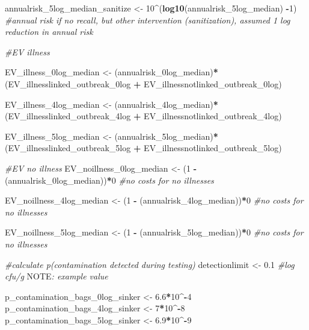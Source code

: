 \documentclass[
]{article}
\newenvironment{Shaded}{\begin{snugshade}}{\end{snugshade}}
\newcommand{\AlertTok}[1]{\textcolor[rgb]{0.94,0.16,0.16}{#1}}
\newcommand{\CommentTok}[1]{\textcolor[rgb]{0.56,0.35,0.01}{\textit{#1}}}
\newcommand{\DecValTok}[1]{\textcolor[rgb]{0.00,0.00,0.81}{#1}}
\newcommand{\FloatTok}[1]{\textcolor[rgb]{0.00,0.00,0.81}{#1}}
\newcommand{\FunctionTok}[1]{\textcolor[rgb]{0.13,0.29,0.53}{\textbf{#1}}}
\newcommand{\NormalTok}[1]{#1}
\newcommand{\OtherTok}[1]{\textcolor[rgb]{0.56,0.35,0.01}{#1}}
\newcommand{\SpecialCharTok}[1]{\textcolor[rgb]{0.81,0.36,0.00}{\textbf{#1}}}
\begin{document}
\begin{Shaded}
\begin{Highlighting}[]
\NormalTok{annualrisk\_5log\_median\_sanitize }\OtherTok{\textless{}{-}} \DecValTok{10}\SpecialCharTok{\^{}}\NormalTok{(}\FunctionTok{log10}\NormalTok{(annualrisk\_5log\_median) }\SpecialCharTok{{-}}\DecValTok{1}\NormalTok{) }\CommentTok{\#annual risk if no recall, but other intervention (sanitization), assumed 1 log reduction in annual risk}


\CommentTok{\#EV illness}

\NormalTok{EV\_illness\_0log\_median }\OtherTok{\textless{}{-}}\NormalTok{ (annualrisk\_0log\_median)}\SpecialCharTok{*}\NormalTok{(EV\_illnesslinked\_outbreak\_0log }\SpecialCharTok{+}\NormalTok{ EV\_illnessnotlinked\_outbreak\_0log)}

\NormalTok{EV\_illness\_4log\_median }\OtherTok{\textless{}{-}}\NormalTok{ (annualrisk\_4log\_median)}\SpecialCharTok{*}\NormalTok{(EV\_illnesslinked\_outbreak\_4log }\SpecialCharTok{+}\NormalTok{ EV\_illnessnotlinked\_outbreak\_4log)}

\NormalTok{EV\_illness\_5log\_median }\OtherTok{\textless{}{-}}\NormalTok{ (annualrisk\_5log\_median)}\SpecialCharTok{*}\NormalTok{(EV\_illnesslinked\_outbreak\_5log }\SpecialCharTok{+}\NormalTok{ EV\_illnessnotlinked\_outbreak\_5log)}

\CommentTok{\#EV no illness}
\NormalTok{EV\_noillness\_0log\_median }\OtherTok{\textless{}{-}}\NormalTok{ (}\DecValTok{1} \SpecialCharTok{{-}}\NormalTok{ (annualrisk\_0log\_median))}\SpecialCharTok{*}\DecValTok{0} \CommentTok{\#no costs for no illnesses}

\NormalTok{EV\_noillness\_4log\_median }\OtherTok{\textless{}{-}}\NormalTok{ (}\DecValTok{1} \SpecialCharTok{{-}}\NormalTok{ (annualrisk\_4log\_median))}\SpecialCharTok{*}\DecValTok{0} \CommentTok{\#no costs for no illnesses}

\NormalTok{EV\_noillness\_5log\_median }\OtherTok{\textless{}{-}}\NormalTok{ (}\DecValTok{1} \SpecialCharTok{{-}}\NormalTok{ (annualrisk\_5log\_median))}\SpecialCharTok{*}\DecValTok{0} \CommentTok{\#no costs for no illnesses}


\CommentTok{\#calculate p(contamination detected during testing)}
\NormalTok{detectionlimit }\OtherTok{\textless{}{-}} \FloatTok{0.1} \CommentTok{\#log cfu/g  }\AlertTok{NOTE}\CommentTok{: example value}

\NormalTok{p\_contamination\_bags\_0log\_sinker }\OtherTok{\textless{}{-}} \FloatTok{6.6}\SpecialCharTok{*}\DecValTok{10}\SpecialCharTok{\^{}{-}}\DecValTok{4}
\NormalTok{p\_contamination\_bags\_4log\_sinker }\OtherTok{\textless{}{-}} \DecValTok{7}\SpecialCharTok{*}\DecValTok{10}\SpecialCharTok{\^{}{-}}\DecValTok{8}
\NormalTok{p\_contamination\_bags\_5log\_sinker }\OtherTok{\textless{}{-}} \FloatTok{6.9}\SpecialCharTok{*}\DecValTok{10}\SpecialCharTok{\^{}{-}}\DecValTok{9}


\end{Highlighting}
\end{Shaded}
\end{document}
